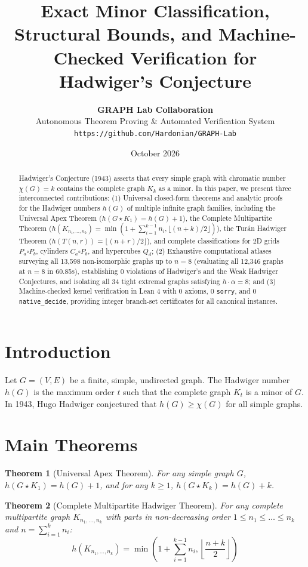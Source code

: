 \documentclass[11pt,a4paper]{article}
\title{\textbf{Exact Minor Classification, Structural Bounds, and Machine-Checked Verification for Hadwiger's Conjecture}}
\author{\textbf{GRAPH Lab Collaboration} \\
Autonomous Theorem Proving \& Automated Verification System \\
\texttt{https://github.com/Hardonian/GRAPH-Lab}}
\date{October 2026}
\newtheorem{theorem}{Theorem}
\theoremstyle{definition}
\begin{document}
\maketitle

\begin{abstract}
Hadwiger's Conjecture (1943) asserts that every simple graph with chromatic number $\chi(G) = k$ contains the complete graph $K_k$ as a minor. In this paper, we present three interconnected contributions:
(1) Universal closed-form theorems and analytic proofs for the Hadwiger numbers $h(G)$ of multiple infinite graph families, including the Universal Apex Theorem ($h(G \star K_1) = h(G) + 1$), the Complete Multipartite Theorem ($h(K_{n_1, \dots, n_k}) = \min(1 + \sum_{i=1}^{k-1} n_i, \lfloor (n + k)/2 \rfloor)$), the Tur\'an Hadwiger Theorem ($h(T(n, r)) = \lfloor (n + r)/2 \rfloor$), and complete classifications for 2D grids $P_a \square P_b$, cylinders $C_a \square P_b$, and hypercubes $Q_d$;
(2) Exhaustive computational atlases surveying all 13,598 non-isomorphic graphs up to $n=8$ (evaluating all 12,346 graphs at $n=8$ in 60.85s), establishing 0 violations of Hadwiger's and the Weak Hadwiger Conjectures, and isolating all 34 tight extremal graphs satisfying $h \cdot \alpha = 8$; and
(3) Machine-checked kernel verification in Lean 4 with 0 axioms, 0 \texttt{sorry}, and 0 \texttt{native\_decide}, providing integer branch-set certificates for all canonical instances.
\end{abstract}

\section{Introduction}
Let $G = (V, E)$ be a finite, simple, undirected graph. The Hadwiger number $h(G)$ is the maximum order $t$ such that the complete graph $K_t$ is a minor of $G$. In 1943, Hugo Hadwiger conjectured that $h(G) \ge \chi(G)$ for all simple graphs.

\section{Main Theorems}

\begin{theorem}[Universal Apex Theorem]
For any simple graph $G$, $h(G \star K_1) = h(G) + 1$, and for any $k \ge 1$, $h(G \star K_k) = h(G) + k$.
\end{theorem}

\begin{theorem}[Complete Multipartite Hadwiger Theorem]
For any complete multipartite graph $K_{n_1, \dots, n_k}$ with parts in non-decreasing order $1 \le n_1 \le \dots \le n_k$ and $n = \sum_{i=1}^k n_i$:
\[
h(K_{n_1, \dots, n_k}) = \min\left(1 + \sum_{i=1}^{k-1} n_i, \left\lfloor \frac{n + k}{2} \right\rfloor\right)
\]
\end{theorem}
\end{document}

